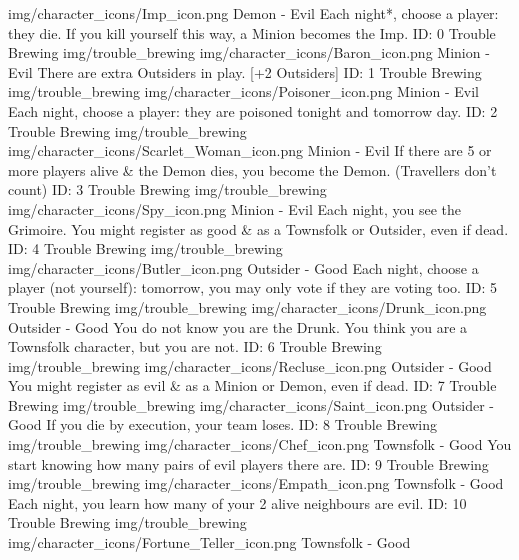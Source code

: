 	{img/character_icons/Imp_icon.png}
	{\color{evilcolor}Demon - Evil}
	{Each night*, choose a player: they die. If you kill yourself this way, a Minion becomes the Imp.}        
	{ID: 0}
	{Trouble Brewing}
	{img/trouble_brewing}
	{img/character_icons/Baron_icon.png}
	{\color{evilcolor}Minion - Evil}
	{There are extra Outsiders in play. [+2 Outsiders]}        
	{ID: 1}
	{Trouble Brewing}
	{img/trouble_brewing}
	{img/character_icons/Poisoner_icon.png}
	{\color{evilcolor}Minion - Evil}
	{Each night, choose a player: they are poisoned tonight and tomorrow day.}        
	{ID: 2}
	{Trouble Brewing}
	{img/trouble_brewing}
	{img/character_icons/Scarlet_Woman_icon.png}
	{\color{evilcolor}Minion - Evil}
	{If there are 5 or more players alive \& the Demon dies, you become the Demon. (Travellers don't count)}        
	{ID: 3}
	{Trouble Brewing}
	{img/trouble_brewing}
	{img/character_icons/Spy_icon.png}
	{\color{evilcolor}Minion - Evil}
	{Each night, you see the Grimoire. You might register as good \& as a Townsfolk or Outsider, even if dead.}        
	{ID: 4}
	{Trouble Brewing}
	{img/trouble_brewing}
	{img/character_icons/Butler_icon.png}
	{\color{goodcolor}Outsider - Good}
	{Each night, choose a player (not yourself): tomorrow, you may only vote if they are voting too.}        
	{ID: 5}
	{Trouble Brewing}
	{img/trouble_brewing}
	{img/character_icons/Drunk_icon.png}
	{\color{goodcolor}Outsider - Good}
	{You do not know you are the Drunk. You think you are a Townsfolk character, but you are not.}        
	{ID: 6}
	{Trouble Brewing}
	{img/trouble_brewing}
	{img/character_icons/Recluse_icon.png}
	{\color{goodcolor}Outsider - Good}
	{You might register as evil \& as a Minion or Demon, even if dead.}        
	{ID: 7}
	{Trouble Brewing}
	{img/trouble_brewing}
	{img/character_icons/Saint_icon.png}
	{\color{goodcolor}Outsider - Good}
	{If you die by execution, your team loses.}        
	{ID: 8}
	{Trouble Brewing}
	{img/trouble_brewing}
	{img/character_icons/Chef_icon.png}
	{\color{goodcolor}Townsfolk - Good}
	{You start knowing how many pairs of evil players there are.}        
	{ID: 9}
	{Trouble Brewing}
	{img/trouble_brewing}
	{img/character_icons/Empath_icon.png}
	{\color{goodcolor}Townsfolk - Good}
	{Each night, you learn how many of your 2 alive neighbours are evil.}        
	{ID: 10}
	{Trouble Brewing}
	{img/trouble_brewing}
	{img/character_icons/Fortune_Teller_icon.png}
	{\color{goodcolor}Townsfolk - Good}
